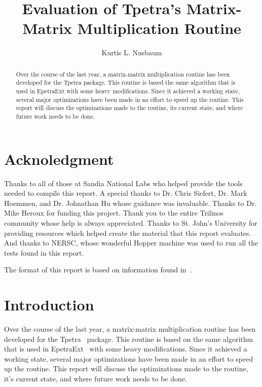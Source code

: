 \documentclass[pdf,12pt]{SANDreport}
\title{Evaluation of Tpetra's Matrix-Matrix Multiplication Routine}
\author{Kurtis L. Nusbaum}
\date{}
\begin{document}
\VerbatimFootnotes

\maketitle

\begin{abstract}
Over the course of the last year, a matrix-matrix multiplication routine has been developed for the Tpetra package.
This routine is based the same algorithm that is used in EpetraExt with some heavy modifications. Since it 
achieved a working state, several major optimizations have been made in an effort to speed up the routine. This report will
discuss the optimizations made to the routine, its current state, and where future work needs to be done.
\end{abstract}
\clearpage
\section*{Acknoledgment}
Thanks to all of those at Sandia National Labs who helped provide the tools needed to compile this report. 
A special thanks to Dr. Chris 
Siefert, Dr. Mark Hoemmen, and Dr. Johnathan Hu whose guidance was invaluable. Thanks to Dr. Mike Heroux for funding this 
project. Thank you to the entire Trilinos community whose help is always appreciated. Thanks to St. John's University
for providing resources which helped create the material that this report evaluates. And thanks
to NERSC, whose wonderful Hopper machine was used to run all the tests found in this report.

The format of this report is based on information found in~\cite{Sand98-0730}.
\cleardoublepage
\tableofcontents
\listoffigures
\listoftables
\clearpage

\SANDmain
\section{Introduction}
Over the course of the last year, a matrix-matrix multiplication routine has been developed for the 
Tpetra~\cite{TpetraHomePage}
package. This routine is based on the same algorithm that is used in EpetraExt~\cite{EpetraExtHomePage} 
with some heavy modifications. Since it achieved a working state, several major optimizations have been made in an 
effort to speed up the routine. This report will
discuss the optimizations made to the routine, it's current state, and where future work needs to be done.
\end{document}

